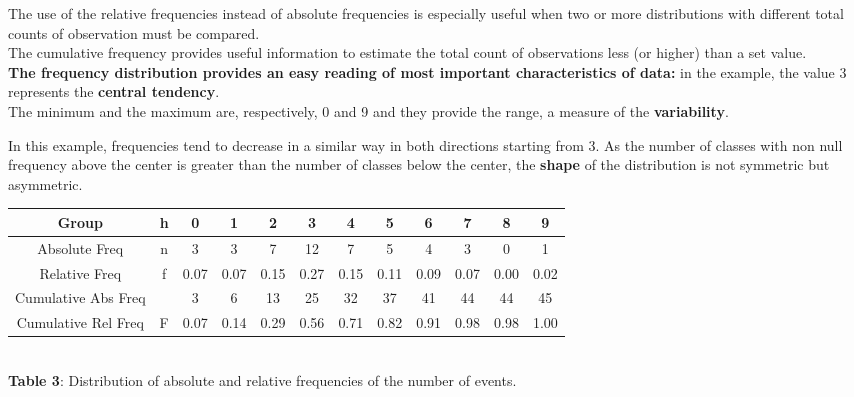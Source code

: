 \begin{frame}
  \vspace*{.25cm}
  The use of the relative frequencies instead of absolute frequencies is especially useful when two or more distributions with different total counts of observation must be compared. \\
  \vspace*{.25cm}
  The cumulative frequency provides useful information to estimate the total count of observations less (or higher) than a set value. \\
  \vspace*{.25cm}
  \textbf{The frequency distribution provides an easy reading of most important characteristics of data:} in the example, the value 3 represents the \textbf{central tendency}. \\
  \vspace*{.25cm}
  The minimum and the maximum are, respectively, 0 and 9 and they provide the range, a measure of the \textbf{variability}.
\end{frame}

\begin{frame}
  \vspace*{.25cm}
  In this example, frequencies tend to decrease in a similar way in both directions starting from 3.
  As the number of classes with non null frequency above the center is greater than the number of classes below the center, the \textbf{shape} of the distribution is not symmetric but asymmetric.
  \vspace*{.5cm}
  \begin{table}
    \centering
    \begin{tiny}
      \begin{tabular}{|*{12}{c|}}
        \hline
        \textbf{Group} & \textbf{h} & \textbf{0} & \textbf{1} & \textbf{2} & \textbf{3} & \textbf{4} & \textbf{5} & \textbf{6} & \textbf{7} & \textbf{8} & \textbf{9}  \\
        \hline
        Absolute Freq & n & 3 & 3 & 7 & 12 & 7 & 5 & 4 & 3 & 0 & 1  \\
        \hline
        Relative Freq & f & 0.07 & 0.07 & 0.15 & 0.27 & 0.15 & 0.11 & 0.09 & 0.07 & 0.00 & 0.02 \\
        \hline
        Cumulative Abs Freq &  & 3 & 6 & 13 & 25 & 32 & 37 & 41 & 44 & 44 & 45  \\
        \hline
        Cumulative Rel Freq & F & 0.07 & 0.14 & 0.29 & 0.56 & 0.71 & 0.82 & 0.91 & 0.98 & 0.98 & 1.00  \\
        \hline
      \end{tabular} \\
    \vspace*{.2cm}
    \textbf{Table 3}: Distribution of absolute and relative frequencies of the number of events.\\
    \end{tiny}
  \end{table}
\end{frame}

